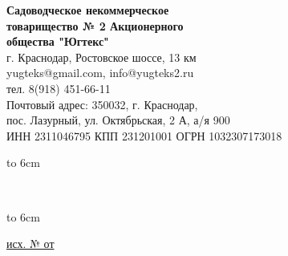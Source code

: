 \noindent\parbox[l][71mm]{80mm}
{
	 \begin{center}
 { \textbf{Садоводческое некоммерческое\\ товарищество
 	№  2 Акционерного\\ общества "Югтекс"\\
 }}
 \footnotesize{г. Краснодар, Ростовское шоссе, 13 км\\
 	yugteks@gmail.com, info@yugteks2.ru\\
 	тел. 8(918) 451-66-11\\
 	Почтовый адрес: 350032, г. Краснодар,\\ пос. Лазурный, ул. Октябрьская, 2 А, а/я   900
  }\\
 {ИНН 2311046795 КПП 231201001 ОГРН 1032307173018}
		\end{center}
\hbox to 6cm{ }}\hfill
\parbox[l][71mm]{65mm}
{ \begin{center}
{
	\textbf{}\\
	\vspace{3mm}
 {\footnotesize {} }

	}
\end{center}
\hbox to 6cm{ }}
\linebreak
\vspace{-17mm}

\underline{исх. №  от } 